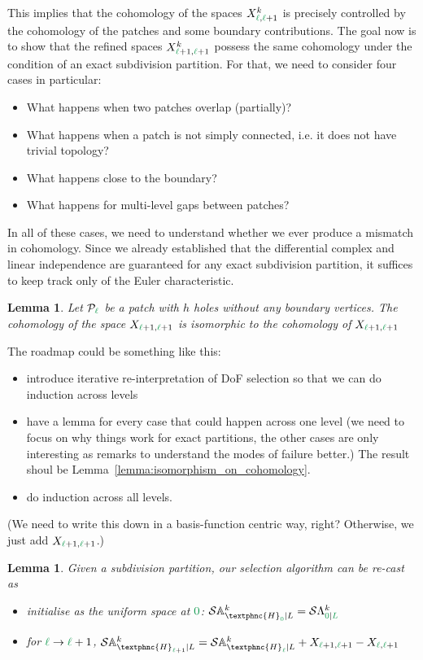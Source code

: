\documentclass[12pt, a4paper]{article}
\newcommand{\green}{\color{ForestGreen}}
\renewcommand{\l}{{\green\ell}}
\renewcommand{\L}{{\green L}}
\newcommand{\lzero}{{\green 0}}
\newcommand{\SDFspace}[3]{\mathcal{S}\Lambda^{#1}_{#2 \vert #3}}
\newcommand{\heth}{\textphnc{H}}
\newcommand{\C}{\heth}
\newcommand{\calP}{\mathcal{P}}
\newcommand{\activeDoFs}{\mathbb{A}}
\newcommand{\hierSDFspace}[3]{\mathcal{S}\activeDoFs^{#1}_{#2 \vert #3}}
\newtheorem{lemma}[theorem]{Lemma}
\numberwithin{equation}{section}
\begin{document}
This implies that the cohomology of the spaces $X^k_{\l, \l+1}$ is precisely controlled by the cohomology of the patches and some boundary contributions. The goal now is to show that the refined spaces $X^k_{\l+1, \l+1}$ possess the same cohomology under the condition of an exact subdivision partition. For that, we need to consider four cases in particular:

\begin{itemize}
    \item What happens when two patches overlap (partially)?
    \item What happens when a patch is not simply connected, i.e. it does not have trivial topology?
    \item What happens close to the boundary?
    \item What happens for multi-level gaps between patches?
\end{itemize}

In all of these cases, we need to understand whether we ever produce a mismatch in cohomology. Since we already established that the differential complex and linear independence are guaranteed for any exact subdivision partition, it suffices to keep track only of the Euler characteristic.

\begin{lemma}
    Let $\calP_\l$ be a patch with $h$ holes without any boundary vertices. The cohomology of the space $X_{\l+1, \l+1}$ is isomorphic to the cohomology of $X_{\l+1, \l+1}$
\end{lemma}

The roadmap could be something like this: 
\begin{itemize}
    \item introduce iterative re-interpretation of DoF selection so that we can do induction across levels
    \item have a lemma for every case that could happen across one level (we need to focus on why things work for exact partitions, the other cases are only interesting as remarks to understand the modes of failure better.) The result shoul be Lemma~\ref{lemma:isomorphism_on_cohomology}.
    \item do induction across all levels.
\end{itemize}

(We need to write this down in a basis-function centric way, right? Otherwise, we just add $X_{\l+1, \l+1}$.)

\begin{lemma}
    Given a subdivision partition, our selection algorithm can be re-cast as
    \begin{itemize}
        \item initialise as the uniform space at $\lzero$: $\hierSDFspace{k}{\C_\lzero}{L} = \SDFspace{k}{\lzero}{\L}$
        \item for $\l \to \l+1$, $\hierSDFspace{k}{\C_{\l+1}}{L} = \hierSDFspace{k}{\C_\l}{L} + X_{\l+1, \l+1} - X_{\l,\l+1}$
    \end{itemize}
\end{lemma}
\end{document}
